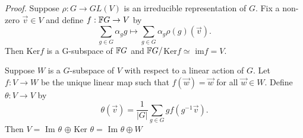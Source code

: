 \documentclass[a4paper]{article}
\begin{document}
\textit{Proof.} Suppose $\rho: G \to GL(V)$ is an irreducible representation of $G$. Fix a non-zero $\vec{v} \in V$ and define $f: \mathbb{F} G \to V$ by $$\sum_{g \in G} \alpha_g g \mapsto \sum_{g \in G} \alpha_g \rho(g) (\vec{v}).$$
Then Ker$f$ is a G-subspace of $\mathbb{F} G$ and $\mathbb{F} G /$Ker$f \simeq$ im$f =  V$.

Suppose $W$ is a $G$-subspace of $V$ with respect to a linear action of $G$. Let $f: V \to W$ be the unique linear map such that $f(\vec{w}) = \vec{w}$ for all $\vec{w} \in W$. Define $\theta: V \to V$ by $$\theta(\vec{v}) = \frac{1}{|G|} \sum_{g \in G} gf(g^{-1}\vec{v}).$$ Then $V = $ Im $\theta$ $ \oplus $ Ker $\theta =$ Im $\theta \oplus W$
\end{document}
